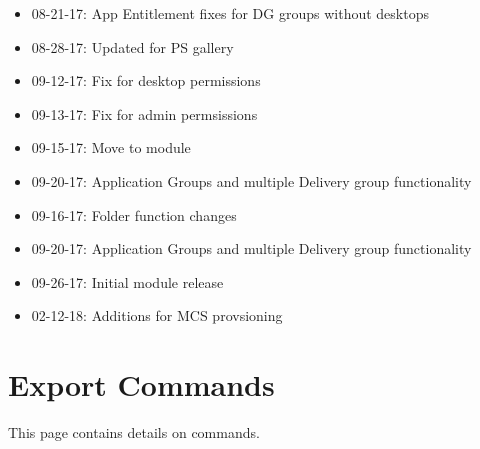 \documentclass[letterpaper,10pt,english]{sphinxmanual}
\begin{document}
\begin{itemize}
\item {} 
08-21-17: App Entitlement fixes for DG groups without desktops

\item {} 
08-28-17: Updated for PS gallery

\item {} 
09-12-17: Fix for desktop permissions

\item {} 
09-13-17: Fix for admin permsissions

\item {} 
09-15-17: Move to module

\item {} 
09-20-17: Application Groups and multiple Delivery group functionality

\item {} 
09-16-17: Folder function changes

\item {} 
09-20-17: Application Groups and multiple Delivery group functionality

\item {} 
09-26-17: Initial module release

\item {} 
02-12-18: Additions for MCS provsioning

\end{itemize}


\chapter{Export Commands}
\label{\detokenize{cmd_export:export-commands}}\label{\detokenize{cmd_export::doc}}
This page contains details on  commands.
\end{document}

